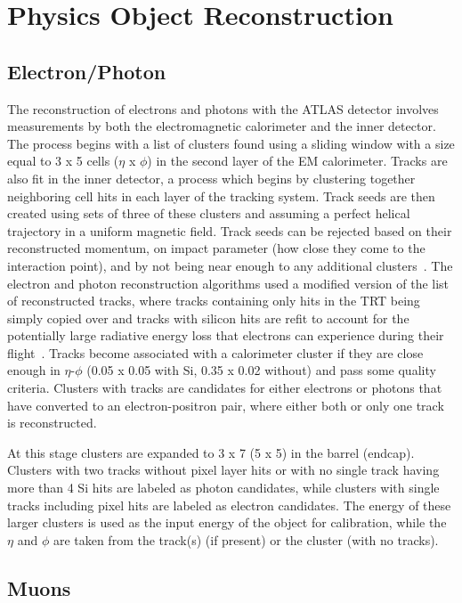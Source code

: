 \chapter{Physics Object Reconstruction}
\label{Reco}

\section{Electron/Photon}
\label{EMReco}
The reconstruction of electrons and photons with the ATLAS detector involves measurements by both the electromagnetic calorimeter and the inner detector.  
The process begins with a list of clusters found using a sliding window with a size equal to 3 x 5 cells ($\eta$ x $\phi$) in the second layer of the EM calorimeter.  
Tracks are also fit in the inner detector, a process which begins by clustering together neighboring cell hits in each layer of the tracking system.  
Track seeds are then created using sets of three of these clusters and assuming a perfect helical trajectory in a uniform magnetic field.  
Track seeds can be rejected based on their reconstructed momentum, on impact parameter (how close they come to the interaction point), and by not being near enough to any additional clusters~\cite{Aaboud:2017all}.  
The electron and photon reconstruction algorithms used a modified version of the list of reconstructed tracks, where tracks containing only hits in the TRT being simply copied over and tracks with silicon hits are refit to account for the potentially large radiative energy loss that electrons can experience during their flight~\cite{ATLAS-CONF-2012-047}.  
Tracks become associated with a calorimeter cluster if they are close enough in $\eta$-$\phi$ (0.05 x 0.05 with Si, 0.35 x 0.02 without) and pass some quality criteria.  
Clusters with tracks are candidates for either electrons or photons that have converted to an electron-positron pair, where either both or only one track is reconstructed.  

At this stage clusters are expanded to 3 x 7 (5 x 5) in the barrel (endcap).  
Clusters with two tracks without pixel layer hits or with no single track having more than 4 Si hits are labeled as photon candidates, while clusters with single tracks including pixel hits are labeled as electron candidates.  
The energy of these larger clusters is used as the input energy of the object for calibration, while the $\eta$ and $\phi$ are taken from the track(s) (if present) or the cluster (with no tracks).  

\section{Muons}
\label{Muons}

